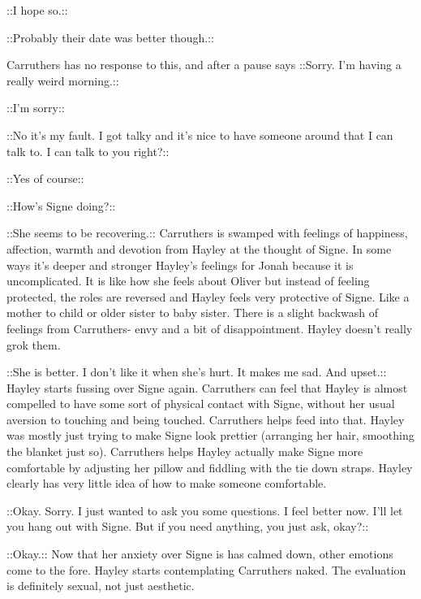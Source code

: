  {\color[RGB]{153,0,255}::I hope so.::} 

 {\color[RGB]{255,153,0}::Probably their date was better though.::} 

Carruthers has no response to this, and after a pause says  {\color[RGB]{153,0,255}::Sorry.  I'm having a really weird morning.::} 

 {\color[RGB]{255,153,0}::I'm sorry::} 

 {\color[RGB]{153,0,255}::No it's my fault.  I got talky and it's nice to have someone around that I can talk to.  I can talk to you right?::} 

 {\color[RGB]{255,153,0}::Yes of course::} 

 {\color[RGB]{153,0,255}::How's Signe doing?::} 

 {\color[RGB]{255,153,0}::She seems to be recovering.:: } Carruthers is swamped with feelings of happiness, affection, warmth and devotion from Hayley at the thought of Signe.  In some ways it's deeper and stronger Hayley's feelings for Jonah because it is uncomplicated.  It is like how she feels about Oliver but instead of feeling protected, the roles are reversed and Hayley feels very protective of Signe.  Like a mother to child or older sister to baby sister.  There is a slight backwash of feelings from Carruthers- envy and a bit of disappointment.  Hayley doesn't really grok them.  

 {\color[RGB]{255,153,0}::She is better.  I don't like it when she's hurt.  It makes me sad.  And upset.::}  Hayley starts fussing over Signe again.  Carruthers can feel that Hayley is almost compelled to have some sort of physical contact with Signe, without her usual aversion to touching and being touched.  Carruthers helps feed into that.  Hayley was mostly just trying to make Signe look prettier (arranging her hair, smoothing the blanket just so).  Carruthers helps Hayley actually make Signe more comfortable by adjusting her pillow and fiddling with the tie down straps.  Hayley clearly has very little idea of how to make someone comfortable.

 {\color[RGB]{153,0,255}::Okay.  Sorry.  I just wanted to ask you some questions.  I feel better now.  I'll let you hang out with Signe. But if you need anything, you just ask, okay?::} 

 {\color[RGB]{255,153,0}::Okay.::}   Now that her anxiety over Signe is has calmed down, other emotions come to the fore.  Hayley starts contemplating Carruthers naked.  The evaluation is definitely sexual, not just aesthetic.  

